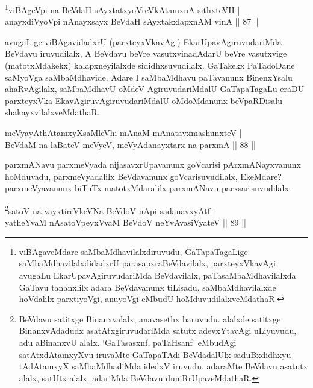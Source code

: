 \begin{shl}
\footnote{viBAgaveMdare saMbaMdhavilalxdiruvudu, GaTapaTagaLige saMbaMdhavilalxdidadxrU parasapxraBeVdavilalx, parxteyxVkavAgi avugaLu EkarUpavAgiruvudariMda BeVdavilalx, paTasaMbaMdhavilalxda GaTavu tananxlilx adara BeVdavanunx tiLisadu, saMbaMdhavilalxde hoVdalilx parxtiyoVgi, anuyoVgi eMbudU hoMduvudilalxveMdathaR.}viBAgeV\s pi na BeVdaH sAyxtatxyoVreVkAtamxnA sithxteVH  | \\
anayxdiVyoV\s pi nAnayxsayx BeVdaH sAyxtakxlapxnAM vinA \hfill||  87 ||  
\end{shl}

\begin{artha}
avugaLige viBAgavidadxrU (parxteyxVkavAgi) EkarUpavAgiruvudariMda BeVdavu iruvudilalx, A BeVdavu beVre vasutxvinadAdarU beVre vasutxvige (matotxMdakekx) kalapxneyilalxde sididhxsuvudilalx. GaTakekx PaTadoDane saMyoVga saMbaMdhavide. Adare I saMbaMdhavu paTavanunx BinenxYsalu ahaRvAgilalx, saMbaMdhavU oMdeV AgiruvudariMdalU GaTapaTagaLu eraDU parxteyxVka EkavAgiruvAgiruvudariMdalU oMdoMdanunx beVpaRDisalu shakayxvilalxveMdathaR. 
\end{artha}


\begin{shl}
meVyayAthAtamxyXsaMleVhi mAnaM mAnatavxmashunxteV  | \\
BeVdaM na laBateV meVyeV, meVyAdanayxtarx na parxmA \hfill||  88 ||  
\end{shl}

\begin{artha}
parxmANavu parxmeVyada nijasavxrUpavanunx goVcarisi pArxmANayxvanunx hoMduvadu, parxmeVyadalilx BeVdavanunx goVcarisuvudilalx, EkeMdare? parxmeVyavanunx biTuTx matotxMdaralilx parxmANavu parxsarisuvudilalx.
\end{artha}

\begin{shl}
\footnote{BeVdavu satitxge Binanxvalalx, anavasethx baruvudu. alalxde satitxge BinanxvAdadudx asatAtxgiruvudariMda satutx adevxYtavAgi uLiyuvudu, adu aBinanxvU alalx. `GaTasasxnf, paTaHsanf' eMbudAgi satAtxdAtamxyXvu iruvaMte GaTapaTAdi BeVdadalUlx saduBxdidhxyu tAdAtamxyX saMbaMdhadiMda idedxV iruvudu. adaraMte BeVdavu asatutx alalx, satUtx alalx. adariMda BeVdavu duniRrUpaveMdathaR.}satoV na vayxtireVkeVNa BeVdoV nApi sadanavxyAtf  | \\
yatheYvaM nAsatoV\s peyxVvaM BeVdoV neYvAvasiVyateV \hfill||  89 ||  
\end{shl}

